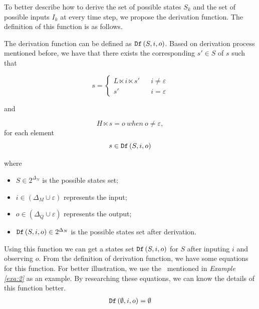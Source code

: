  
To better describe how to derive the set of possible states $S_k$ and the set of possible inputs $I_k$ at every time step, we propose the derivation function. The definition of this function is as follows.
\begin{definition} The derivation function can be defined as ${\tt Df}\left(S, i, o\right)$. Based on derivation process mentioned before, we have that there exists the corresponding $s'\in S$ of $s$ such that 

\[s=\left\{
\begin{array}{rcl}
L\ltimes i\ltimes s'      &      & {i\neq \varepsilon}\\
s'       &      & {i= \varepsilon}
\end{array} \right. \]

and 

\[H\ltimes s=o\ when\ o\neq \varepsilon, \]
for each element \[s\in {\tt Df}\left(S, i, o\right)\]
\end{definition}
where   
\begin{itemize}
  \item $S\in 2^{\Delta_N}$ is the possible states set;
  \item $i\in (\Delta_M\cup\varepsilon)$ represents the input;
  \item $o\in(\Delta_Q\cup\varepsilon)$ represents the output; 
  \item ${\tt Df}\left(S, i, o\right)\in 2^{\Delta_N}$ is the possible states set after derivation.
\end{itemize} 
 
 Using this function we can get a states set ${\tt Df}\left(S, i, o\right)$ for $S$ after inputing $i$ and observing $o$. From the definition of derivation function, we have some equations for this function. For better illustration, we use the \BCN\ mentioned in {\em Example \ref{exa:2}} as an example. By researching these equations, we can know the details of this function better.
\begin{equation}
\begin{split}
{\tt Df}\left(\emptyset,i,o\right)=\emptyset\\
\end{split}
\label{equ:7}
\end{equation}

